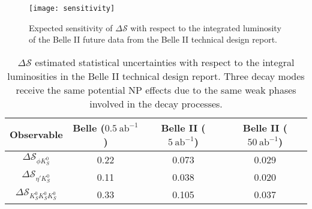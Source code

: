 \begin{figure}[H]
	\centering
	\texttt{[image: sensitivity]}
	\caption{Expected  sensitivity of $\Delta \mathcal{S}$ with respect to the integrated luminosity of the Belle II future data from the Belle II technical design report\cite{Abe:2010gxa}.}
	\label{fig:sensitivity}
\end{figure}

\begin{table}[H]
	\centering
	\large
	\caption{$\Delta \mathcal{S}$ estimated statistical uncertainties with respect to the integral luminosities in the Belle II technical design report\cite{Abe:2010gxa}. Three decay modes receive the same potential NP effects due to the same weak phases involved in the decay processes\cite{gershon2004time}.}
	\label{tab:sensitivity}
	\begin{tabular}{c c c c}
		\toprule
		Observable & Belle ($0.5 \: \text{ab}^{-1}$) & Belle II ($5 \: \text{ab}^{-1}$)& Belle II ($50 \: \text{ab}^{-1}$)\\
		\hline
		$\Delta \mathcal{S}_{\phi K^0_S}$ & 0.22 &  0.073 & 0.029\\
		$\Delta \mathcal{S}_{\eta' K^0_S}$   & 0.11 &  0.038 & 0.020\\
		$\Delta \mathcal{S}_{ K^0_S K^0_S K^0_S}$ & 0.33 & 0.105 & 0.037\\
		\bottomrule
	\end{tabular}
\end{table}


